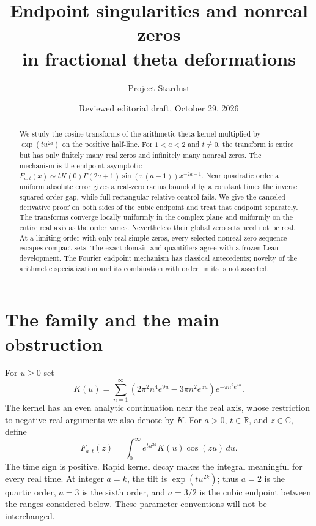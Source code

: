 \documentclass[11pt]{article}
\title{Endpoint singularities and nonreal zeros\protect\\
in fractional theta deformations}
\author{Project Stardust}
\date{Reviewed editorial draft, October 29, 2026}
\theoremstyle{remark}\newtheorem{remark}[theorem]{Remark}
\newcommand{\R}{\mathbb R}\newcommand{\C}{\mathbb C}
\begin{document}
\maketitle
\begin{abstract}
We study the cosine transforms of the arithmetic theta kernel multiplied
by $\exp(tu^{2a})$ on the positive half-line. For $1<a<2$ and $t\neq0$,
the transform is entire but has only finitely many real zeros and
infinitely many nonreal zeros. The mechanism is the endpoint asymptotic
$F_{a,t}(x)\sim tK(0)\Gamma(2a+1)\sin(\pi(a-1))x^{-2a-1}$.
Near quadratic order a uniform absolute error gives a real-zero radius bounded by a constant times the inverse squared order gap, while full rectangular relative control fails. We give the canceled-derivative proof on both sides of the cubic
endpoint and treat that endpoint separately. The transforms converge
locally uniformly in the complex plane and uniformly on the entire
real axis as the order varies. Nevertheless their global zero sets
need not be real. At a limiting order with only real simple zeros,
every selected nonreal-zero sequence escapes compact sets. The exact
domain and quantifiers agree with a frozen Lean development. The
Fourier endpoint mechanism has classical antecedents; novelty of the
arithmetic specialization and its combination with order limits is
not asserted.
\end{abstract}

\section{The family and the main obstruction}
For $u\geq0$ set
\begin{equation}\label{eq:kernel}
 K(u)=\sum_{n=1}^{\infty}
 \left(2\pi^2n^4e^{9u}-3\pi n^2e^{5u}\right)
 e^{-\pi n^2e^{4u}}.
\end{equation}
The kernel has an even analytic continuation near the real axis,
whose restriction to negative real arguments we also denote by $K$.
For $a>0$, $t\in\R$, and $z\in\C$, define
\begin{equation}\label{eq:flow}
 F_{a,t}(z)=\int_0^\infty e^{tu^{2a}}K(u)\cos(zu)\,du.
\end{equation}
The time sign is positive. Rapid kernel decay makes the integral
meaningful for every real time. At integer $a=k$, the tilt is
$\exp(tu^{2k})$; thus $a=2$ is the quartic order, $a=3$ is the sixth
order, and $a=3/2$ is the cubic endpoint between the ranges considered
below. These parameter conventions will not be interchanged.
\end{document}

